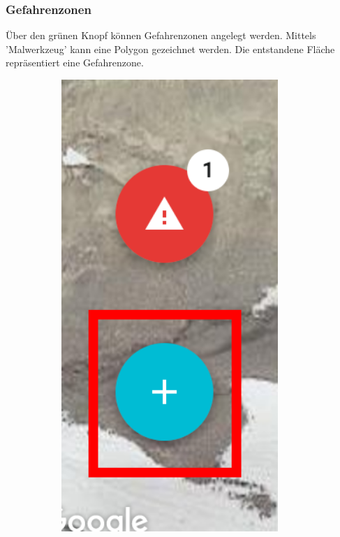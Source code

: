 \documentclass[11pt,english,german]{report}
\theoremstyle{definition}
\begin{document}
\newpage 
\subsubsection{Gefahrenzonen}
Über den grünen Knopf können Gefahrenzonen angelegt werden. Mittels 'Malwerkzeug' kann eine Polygon gezeichnet werden. Die entstandene Fläche repräsentiert eine Gefahrenzone.
\begin{figure}[H]
	\centering
	\begin{subfigure}{.2\textwidth}
		\centering
		\includegraphics[width=0.9\textwidth]{img/atasweb/atas-web-addDangerzone.png}

\end{subfigure}
\end{figure}
\end{document}
